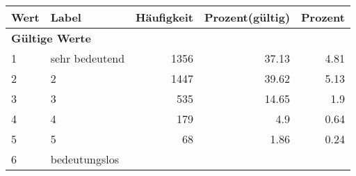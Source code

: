      \begin{longtable}{lXrrr}
     \toprule
     \textbf{Wert} & \textbf{Label} & \textbf{Häufigkeit} & \textbf{Prozent(gültig)} & \textbf{Prozent} \\
     \endhead
     \midrule
     \multicolumn{5}{l}{\textbf{Gültige Werte}}\\

     1 &
     \multicolumn{1}{X}{ sehr bedeutend   } &


       \num{1356} &
       \num[round-mode=places,round-precision=2]{37.13} &
         \num[round-mode=places,round-precision=2]{4.81} \\

     2 &
     \multicolumn{1}{X}{ 2   } &


       \num{1447} &
       \num[round-mode=places,round-precision=2]{39.62} &
         \num[round-mode=places,round-precision=2]{5.13} \\

     3 &
     \multicolumn{1}{X}{ 3   } &


       \num{535} &
       \num[round-mode=places,round-precision=2]{14.65} &
         \num[round-mode=places,round-precision=2]{1.9} \\

     4 &
     \multicolumn{1}{X}{ 4   } &


       \num{179} &
       \num[round-mode=places,round-precision=2]{4.9} &
         \num[round-mode=places,round-precision=2]{0.64} \\

     5 &
     \multicolumn{1}{X}{ 5   } &


       \num{68} &
       \num[round-mode=places,round-precision=2]{1.86} &
         \num[round-mode=places,round-precision=2]{0.24} \\

     6 &
     \multicolumn{1}{X}{ bedeutungslos   } &



\end{longtable}
